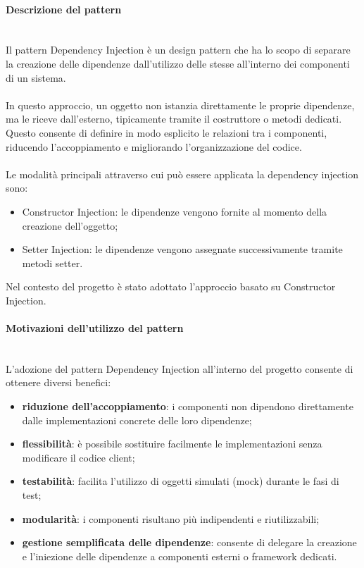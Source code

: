 \documentclass[a4paper,12pt]{article}
\begin{document}
{{{                \paragraph{Descrizione del pattern}\mbox{}\\
                Il pattern Dependency Injection è un design pattern che ha lo scopo di separare la creazione delle dipendenze dall’utilizzo delle stesse all’interno dei componenti di un sistema.\\
                \\
                In questo approccio, un oggetto non istanzia direttamente le proprie dipendenze, ma le riceve dall’esterno, tipicamente tramite il costruttore o metodi dedicati. Questo consente di definire in modo esplicito le relazioni tra i componenti, riducendo l’accoppiamento e migliorando l’organizzazione del codice.\\
                \\
                Le modalità principali attraverso cui può essere applicata la dependency injection sono:
                \begin{itemize}
                    \item Constructor Injection: le dipendenze vengono fornite al momento della creazione dell’oggetto;
                    \item Setter Injection: le dipendenze vengono assegnate successivamente tramite metodi setter.
                \end{itemize}
                
                \noindent Nel contesto del progetto è stato adottato l’approccio basato su Constructor Injection.
                
                \paragraph{Motivazioni dell’utilizzo del pattern}\mbox{}\\
                L’adozione del pattern Dependency Injection all’interno del progetto consente di ottenere diversi benefici:
                \begin{itemize}
                    \item \textbf{riduzione dell’accoppiamento}: i componenti non dipendono direttamente dalle implementazioni concrete delle loro dipendenze;
                    \item \textbf{flessibilità}: è possibile sostituire facilmente le implementazioni senza modificare il codice client;
                    \item \textbf{testabilità}: facilita l’utilizzo di oggetti simulati (mock) durante le fasi di test;
                    \item \textbf{modularità}: i componenti risultano più indipendenti e riutilizzabili;
                    \item \textbf{gestione semplificata delle dipendenze}: consente di delegare la creazione e l’iniezione delle dipendenze a componenti esterni o framework dedicati.
                \end{itemize}
                
}}}
\end{document}
